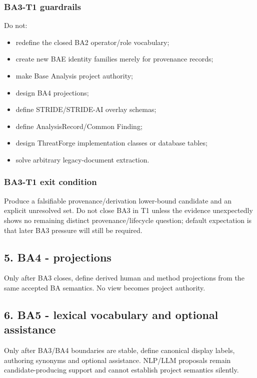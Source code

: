 \documentclass[11pt,a4paper]{article}
\providecommand{\tightlist}{\setlength{\itemsep}{0pt}\setlength{\parskip}{0pt}}
\begin{document}
\subsubsection{BA3-T1 guardrails}\label{ba3-t1-guardrails}

Do not:

\begin{itemize}
\tightlist
\item
  redefine the closed BA2 operator/role vocabulary;
\item
  create new BAE identity families merely for provenance records;
\item
  make Base Analysis project authority;
\item
  design BA4 projections;
\item
  define STRIDE/STRIDE-AI overlay schemas;
\item
  define AnalysisRecord/Common Finding;
\item
  design ThreatForge implementation classes or database tables;
\item
  solve arbitrary legacy-document extraction.
\end{itemize}

\subsubsection{BA3-T1 exit condition}\label{ba3-t1-exit-condition}

Produce a falsifiable provenance/derivation lower-bound candidate and an explicit unresolved set. Do not close BA3 in T1 unless the evidence unexpectedly shows no remaining distinct provenance/lifecycle question; default expectation is that later BA3 pressure will still be required.

\subsection{5. BA4 - projections}\label{ba4---projections}

Only after BA3 closes, define derived human and method projections from the same accepted BA semantics. No view becomes project authority.

\subsection{6. BA5 - lexical vocabulary and optional assistance}\label{ba5---lexical-vocabulary-and-optional-assistance}

Only after BA3/BA4 boundaries are stable, define canonical display labels, authoring synonyms and optional assistance. NLP/LLM proposals remain candidate-producing support and cannot establish project semantics silently.
\end{document}

